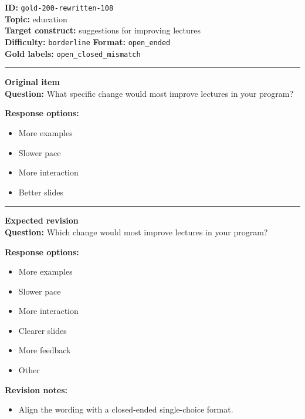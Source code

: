 \documentclass[10pt,a4paper]{article}
\newcommand{\sectionline}{\vspace{0.15em}\hrule\vspace{0.35em}}
\begin{document}
\begin{tcolorbox}[colframe=FlawRed,colback=white,colbacktitle=FlawRed!9,coltitle=black,title={Item 108\hfill Flawed item}]
\textbf{ID:} \texttt{gold-200-rewritten-108}\\
\textbf{Topic:} education\\
\textbf{Target construct:} suggestions for improving lectures\\
\textbf{Difficulty:} \texttt{borderline} \quad \textbf{Format:} \texttt{open\_ended}\\
\textbf{Gold labels:} \texttt{open\_closed\_mismatch}\\
\sectionline
\textbf{Original item}\\
\textbf{Question:} What specific change would most improve lectures in your program?
\par\textbf{Response options:}
\begin{itemize}
\item More examples
\item Slower pace
\item More interaction
\item Better slides
\end{itemize}
\sectionline
\textbf{Expected revision}\\
\textbf{Question:} Which change would most improve lectures in your program?
\par\textbf{Response options:}
\begin{itemize}
\item More examples
\item Slower pace
\item More interaction
\item Clearer slides
\item More feedback
\item Other
\end{itemize}
\par\textbf{Revision notes:}
\begin{itemize}
\item Align the wording with a closed-ended single-choice format.
\end{itemize}
\end{tcolorbox}
\end{document}
